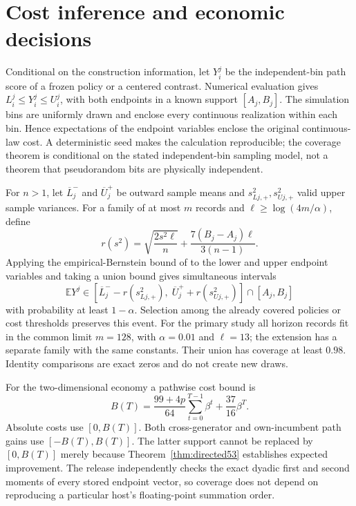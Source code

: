 \section{Cost inference and economic decisions}\label{sec:decisions53}
Conditional on the construction information, let $Y_i^j$ be the independent-bin path score of a frozen policy or a centered contrast. Numerical evaluation gives $L_i^j\le Y_i^j\le U_i^j$, with both endpoints in a known support $[A_j,B_j]$. The simulation bins are uniformly drawn and enclose every continuous realization within each bin. Hence expectations of the endpoint variables enclose the original continuous-law cost. A deterministic seed makes the calculation reproducible; the coverage theorem is conditional on the stated independent-bin sampling model, not a theorem that pseudorandom bits are physically independent.

For $n>1$, let $\overline L_j^-$ and $\overline U_j^+$ be outward sample means and $s_{Lj,+}^2,s_{Uj,+}^2$ valid upper sample variances. For a family of at most $m$ records and $\ell\ge\log(4m/\alpha)$, define
\begin{equation}\label{eq:radius53}
 r(s^2)=\sqrt{\frac{2s^2\ell}{n}}+
              \frac{7(B_j-A_j)\ell}{3(n-1)}.
\end{equation}
Applying the empirical-Bernstein bound of \citet{maurer2009} to the lower and upper endpoint variables and taking a union bound gives simultaneous intervals
\begin{equation}\label{eq:inference53}
 \mathbb EY^j\in
 [\overline L_j^- -r(s_{Lj,+}^2),\;\overline U_j^+ +r(s_{Uj,+}^2)]
 \cap[A_j,B_j]
\end{equation}
with probability at least $1-\alpha$. Selection among the already covered policies or cost thresholds preserves this event. For the primary study all horizon records fit in the common limit $m=128$, with $\alpha=0.01$ and $\ell=13$; the extension has a separate family with the same constants. Their union has coverage at least $0.98$. Identity comparisons are exact zeros and do not create new draws.

For the two-dimensional economy a pathwise cost bound is
\[
 B(T)=\frac{99+4p}{64}\sum_{t=0}^{T-1}\beta^t+
                   \frac{37}{16}\beta^T.
\]
Absolute costs use $[0,B(T)]$. Both cross-generator and own-incumbent path gains use $[-B(T),B(T)]$. The latter support cannot be replaced by $[0,B(T)]$ merely because Theorem~\ref{thm:directed53} establishes expected improvement. The release independently checks the exact dyadic first and second moments of every stored endpoint vector, so coverage does not depend on reproducing a particular host's floating-point summation order.

